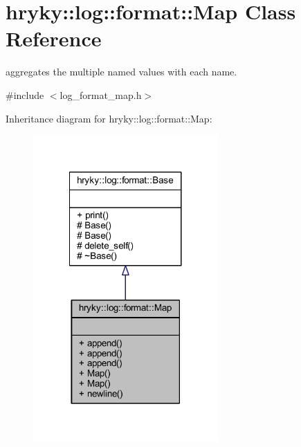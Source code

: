 \hypertarget{classhryky_1_1log_1_1format_1_1_map}{\section{hryky\-:\-:log\-:\-:format\-:\-:Map Class Reference}
\label{classhryky_1_1log_1_1format_1_1_map}
}


aggregates the multiple named values with each name.  




{\ttfamily \#include $<$log\-\_\-format\-\_\-map.\-h$>$}



Inheritance diagram for hryky\-:\-:log\-:\-:format\-:\-:Map\-:\nopagebreak
\begin{figure}[H]
\begin{center}
\leavevmode
\includegraphics[width=200pt]{classhryky_1_1log_1_1format_1_1_map__inherit__graph}
\end{center}
\end{figure}

